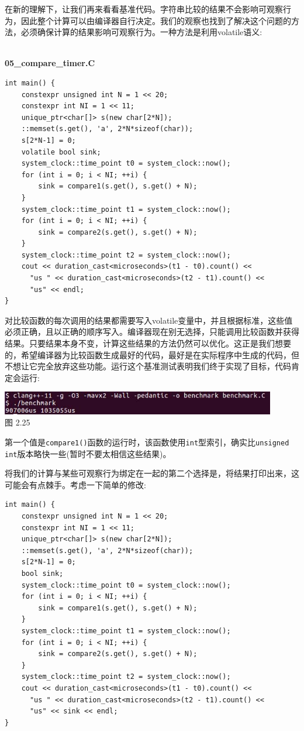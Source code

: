在新的理解下，让我们再来看看基准代码。字符串比较的结果不会影响可观察行为，因此整个计算可以由编译器自行决定。我们的观察也找到了解决这个问题的方法，必须确保计算的结果影响可观察行为。一种方法是利用volatile语义:

\hspace*{\fill} \\ %
\noindent
\textbf{05\_compare\_timer.C}
\begin{lstlisting}[style=styleCXX]
int main() {
	constexpr unsigned int N = 1 << 20;
	constexpr int NI = 1 << 11;
	unique_ptr<char[]> s(new char[2*N]);
	::memset(s.get(), 'a', 2*N*sizeof(char));
	s[2*N-1] = 0;
	volatile bool sink;
	system_clock::time_point t0 = system_clock::now();
	for (int i = 0; i < NI; ++i) {
		sink = compare1(s.get(), s.get() + N);
	}
	system_clock::time_point t1 = system_clock::now();
	for (int i = 0; i < NI; ++i) {
		sink = compare2(s.get(), s.get() + N);
	}
	system_clock::time_point t2 = system_clock::now();
	cout << duration_cast<microseconds>(t1 - t0).count() <<
	  "us " << duration_cast<microseconds>(t2 - t1).count() <<
	  "us" << endl;
}
\end{lstlisting}

对比较函数的每次调用的结果都需要写入volatile变量中，并且根据标准，这些值必须正确，且以正确的顺序写入。编译器现在别无选择，只能调用比较函数并获得结果。只要结果本身不变，计算这些结果的方法仍然可以优化。这正是我们想要的，希望编译器为比较函数生成最好的代码，最好是在实际程序中生成的代码，但不想让它完全放弃这些功能。运行这个基准测试表明我们终于实现了目标，代码肯定会运行:

\begin{center}
\includegraphics[width=0.9\textwidth]{content/1/chapter2/images/25.jpg}\\
图 2.25
\end{center}

第一个值是\texttt{compare1()}函数的运行时，该函数使用\texttt{int}型索引，确实比\texttt{unsigned int}版本略快一些(暂时不要太相信这些结果)。

将我们的计算与某些可观察行为绑定在一起的第二个选择是，将结果打印出来，这可能会有点棘手。考虑一下简单的修改:

\begin{lstlisting}[style=styleCXX]
int main() {
	constexpr unsigned int N = 1 << 20;
	constexpr int NI = 1 << 11;
	unique_ptr<char[]> s(new char[2*N]);
	::memset(s.get(), 'a', 2*N*sizeof(char));
	s[2*N-1] = 0;
	bool sink;
	system_clock::time_point t0 = system_clock::now();
	for (int i = 0; i < NI; ++i) {
		sink = compare1(s.get(), s.get() + N);
	}
	system_clock::time_point t1 = system_clock::now();
	for (int i = 0; i < NI; ++i) {
		sink = compare2(s.get(), s.get() + N);
	}
	system_clock::time_point t2 = system_clock::now();
	cout << duration_cast<microseconds>(t1 - t0).count() <<
	  "us " << duration_cast<microseconds>(t2 - t1).count() <<
	  "us" << sink << endl;
}
\end{lstlisting}

